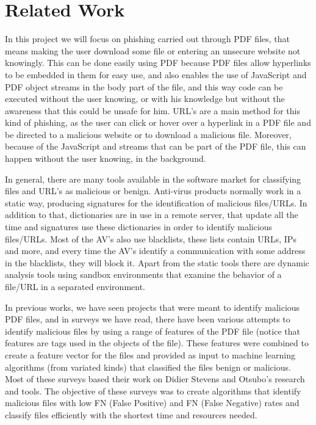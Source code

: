 \documentclass{article}
\begin{document}
\section{Related Work}
\indent In this project we will focus on phishing carried out through PDF files, that means making the user download some file or entering an unsecure website not knowingly. This can be done easily using PDF because PDF files allow hyperlinks to be embedded in them for easy use, and also enables the use of JavaScript and PDF object streams in the body part of the file, and this way code can be executed without the user knowing, or with his knowledge but without the awareness that this could be unsafe for him. URL’s are a main method for this kind of phishing, as the user can click or hover over a hyperlink in a PDF file and be directed to a malicious website or to download a malicious file. Moreover, because of the JavaScript and streams that can be part of the PDF file, this can happen without the user knowing, in the background.

\indent In general, there are many tools available in the software market for classifying files and URL’s as malicious or benign. Anti-virus products normally work in a static way, producing signatures for the identification of malicious files/URLs. In addition to that, dictionaries are in use in a remote server, that update all the time and signatures use these dictionaries in order to identify malicious files/URLs. Most of the AV’s also use blacklists, these lists contain URLs, IPs and more, and every time the AV’s identify a communication with some address in the blacklists, they will block it. Apart from the static tools there are dynamic analysis tools using sandbox environments that examine the behavior of a file/URL in a separated environment. 

\indent In previous works, we have seen projects that were meant to identify malicious PDF files, and in surveys we have read, there have been various attempts to identify malicious files by using a range of features of the PDF file (notice that features are tags used in the objects of the file). These features were combined to create a feature vector for the files and provided as input to machine learning algorithms (from variated kinds) that classified the files benign or malicious. Most of these surveys based their work on Didier Stevens and Otsubo’s research and tools. The objective of these surveys was to create algorithms that identify malicious files with low FN (False Positive) and FN (False Negative) rates and classify files efficiently with the shortest time and resources needed.
\end{document}

